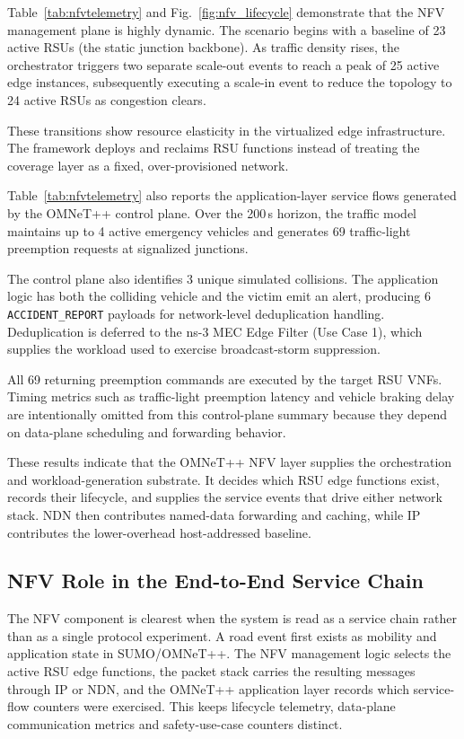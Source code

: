 \documentclass[journal]{IEEEtran}
\begin{document}
Table~\ref{tab:nfvtelemetry} and Fig.~\ref{fig:nfv_lifecycle} demonstrate that the NFV management plane is highly dynamic. The scenario begins with a baseline of 23 active RSUs (the static junction backbone). As traffic density rises, the orchestrator triggers two separate scale-out events to reach a peak of 25 active edge instances, subsequently executing a scale-in event to reduce the topology to 24 active RSUs as congestion clears. 

These transitions show resource elasticity in the virtualized edge infrastructure. The framework deploys and reclaims RSU functions instead of treating the coverage layer as a fixed, over-provisioned network.

Table~\ref{tab:nfvtelemetry} also reports the application-layer service flows generated by the OMNeT++ control plane. Over the 200\,s horizon, the traffic model maintains up to 4 active emergency vehicles and generates 69 traffic-light preemption requests at signalized junctions.

The control plane also identifies 3 unique simulated collisions. The application logic has both the colliding vehicle and the victim emit an alert, producing 6 \texttt{ACCIDENT\_REPORT} payloads for network-level deduplication handling. Deduplication is deferred to the ns-3 MEC Edge Filter (Use Case 1), which supplies the workload used to exercise broadcast-storm suppression.

All 69 returning preemption commands are executed by the target RSU VNFs. Timing metrics such as traffic-light preemption latency and vehicle braking delay are intentionally omitted from this control-plane summary because they depend on data-plane scheduling and forwarding behavior.

These results indicate that the OMNeT++ NFV layer supplies the orchestration and workload-generation substrate. It decides which RSU edge functions exist, records their lifecycle, and supplies the service events that drive either network stack. NDN then contributes named-data forwarding and caching, while IP contributes the lower-overhead host-addressed baseline.

\subsection{NFV Role in the End-to-End Service Chain}

The NFV component is clearest when the system is read as a service chain rather than as a single protocol experiment. A road event first exists as mobility and application state in SUMO/OMNeT++. The NFV management logic selects the active RSU edge functions, the packet stack carries the resulting messages through IP or NDN, and the OMNeT++ application layer records which service-flow counters were exercised. This keeps lifecycle telemetry, data-plane communication metrics and safety-use-case counters
distinct.
\end{document}
